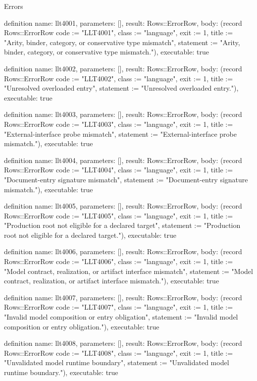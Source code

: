 \begin{lexlean}{Errors}
\begin{semanticmodule}
definition{
  name: llt4001,
  parameters: [],
  result: Rows::ErrorRow,
  body: (record Rows::ErrorRow {code := "LLT4001", class := "language", exit := 1, title := "Arity, binder, category, or conservative type mismatch", statement := "Arity, binder, category, or conservative type mismatch."}),
  executable: true
}

definition{
  name: llt4002,
  parameters: [],
  result: Rows::ErrorRow,
  body: (record Rows::ErrorRow {code := "LLT4002", class := "language", exit := 1, title := "Unresolved overloaded entry", statement := "Unresolved overloaded entry."}),
  executable: true
}

definition{
  name: llt4003,
  parameters: [],
  result: Rows::ErrorRow,
  body: (record Rows::ErrorRow {code := "LLT4003", class := "language", exit := 1, title := "External-interface probe mismatch", statement := "External-interface probe mismatch."}),
  executable: true
}

definition{
  name: llt4004,
  parameters: [],
  result: Rows::ErrorRow,
  body: (record Rows::ErrorRow {code := "LLT4004", class := "language", exit := 1, title := "Document-entry signature mismatch", statement := "Document-entry signature mismatch."}),
  executable: true
}

definition{
  name: llt4005,
  parameters: [],
  result: Rows::ErrorRow,
  body: (record Rows::ErrorRow {code := "LLT4005", class := "language", exit := 1, title := "Production root not eligible for a declared target", statement := "Production root not eligible for a declared target."}),
  executable: true
}

definition{
  name: llt4006,
  parameters: [],
  result: Rows::ErrorRow,
  body: (record Rows::ErrorRow {code := "LLT4006", class := "language", exit := 1, title := "Model contract, realization, or artifact interface mismatch", statement := "Model contract, realization, or artifact interface mismatch."}),
  executable: true
}

definition{
  name: llt4007,
  parameters: [],
  result: Rows::ErrorRow,
  body: (record Rows::ErrorRow {code := "LLT4007", class := "language", exit := 1, title := "Invalid model composition or entry obligation", statement := "Invalid model composition or entry obligation."}),
  executable: true
}

definition{
  name: llt4008,
  parameters: [],
  result: Rows::ErrorRow,
  body: (record Rows::ErrorRow {code := "LLT4008", class := "language", exit := 1, title := "Unvalidated model runtime boundary", statement := "Unvalidated model runtime boundary."}),
  executable: true
}


\end{semanticmodule}
\end{lexlean}
